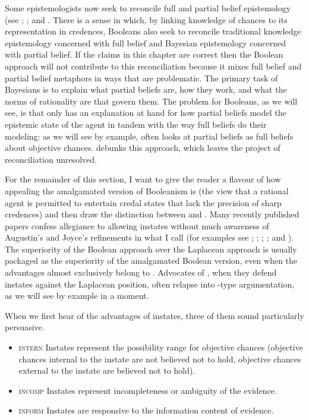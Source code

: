 \documentclass[phd,12pt,oneside]{ubcthesis}
\begin{document}
Some epistemologists now seek to reconcile full and partial belief
epistemology (see ; ; and
. There is a sense in which, by linking knowledge
of chances to its representation in credences, Booleans also seek to
reconcile traditional knowledge epistemology concerned with full
belief and Bayesian epistemology concerned with partial belief. If the
claims in this chapter are correct then the Boolean approach will not
contribute to this reconciliation because it mixes full belief and
partial belief metaphors in ways that are
problematic. The primary task of Bayesians is
to explain what partial beliefs are, how they work, and what the norms
of rationality are that govern them. The problem for Booleans, as we
will see, is that only {\anderson} has an explanation at hand for how
partial beliefs model the epistemic state of the agent in tandem with
the way full beliefs do their modeling: as we will see by example,
{\anderson} often looks at partial beliefs as full beliefs about
objective chances. {\augustin} debunks this approach, which leaves the
project of reconciliation unresolved.

For the remainder of this section, I want to give the reader a flavour
of how appealing the amalgamated version of Booleanism is (the view
that a rational agent is permitted to entertain credal states that
lack the precision of sharp credences) and then draw the distinction
between {\anderson} and {\augustin}. Many recently published papers
confess allegiance to allowing instates without much awareness of
Augustin's and Joyce's refinements in what I call {\augustin} (for
examples see ; ;
; ; and
). The superiority of the Boolean approach over
the Laplacean approach is usually packaged as the superiority of the
amalgamated Boolean version, even when the advantages almost
exclusively belong to {\anderson}. Advocates of {\augustin}, when they
defend instates against the Laplacean position, often relapse into
{\anderson}-type argumentation, as we will see by example in a moment.

When we first hear of the advantages of instates, three of
them sound particularly persuasive.

\begin{itemize}
\item \textsc{intern} Instates represent the possibility range for
  objective chances (objective chances internal to the instate are not
  believed not to hold, objective chances external to the instate are
  believed not to hold).
\item \textsc{incomp} Instates represent incompleteness or
  ambiguity of the evidence.
\item \textsc{inform} Instates are responsive to the information
  content of evidence.
\end{itemize}
\end{document}
